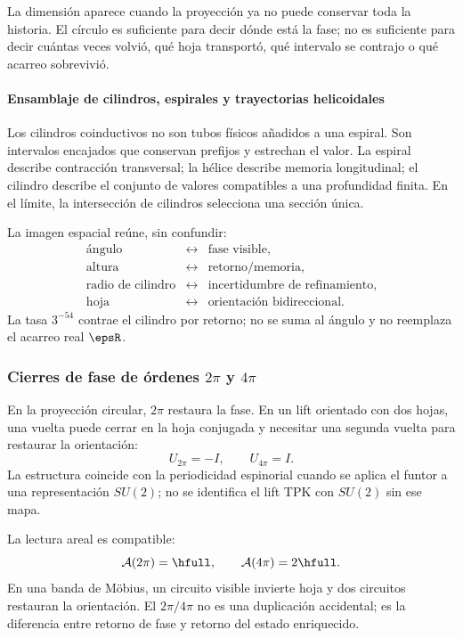 \begin{narrativebox}
La dimensión aparece cuando la proyección ya no puede conservar toda la
historia. El círculo es suficiente para decir dónde está la fase; no es
suficiente para decir cuántas veces volvió, qué hoja transportó, qué intervalo
se contrajo o qué acarreo sobrevivió.
\end{narrativebox}

\paragraph{Ensamblaje de cilindros, espirales y trayectorias helicoidales}

Los cilindros coinductivos no son tubos físicos añadidos a una espiral. Son
intervalos encajados que conservan prefijos y estrechan el valor. La espiral
describe contracción transversal; la hélice describe memoria longitudinal;
el cilindro describe el conjunto de valores compatibles a una profundidad
finita. En el límite, la intersección de cilindros selecciona una sección
única.

La imagen espacial reúne, sin confundir:
\[
\begin{array}{ccl}
\text{ángulo} &\leftrightarrow& \text{fase visible},\\
\text{altura} &\leftrightarrow& \text{retorno/memoria},\\
\text{radio de cilindro} &\leftrightarrow& \text{incertidumbre de refinamiento},\\
\text{hoja} &\leftrightarrow& \text{orientación bidireccional}.
\end{array}
\]
La tasa \(3^{-54}\) contrae el cilindro por retorno; no se suma al ángulo y
no reemplaza el acarreo real \(\epsR\).

\subsubsection{Cierres de fase de órdenes \(2\pi\) y \(4\pi\)}

En la proyección circular, \(2\pi\) restaura la fase. En un lift orientado
con dos hojas, una vuelta puede cerrar en la hoja conjugada y necesitar una
segunda vuelta para restaurar la orientación:
\[
U_{2\pi}=-I,\qquad U_{4\pi}=I.
\]
La estructura coincide con la periodicidad espinorial cuando se aplica el
funtor a una representación \(SU(2)\); no se identifica el lift TPK con
\(SU(2)\) sin ese mapa.

La lectura areal es compatible:
\[
\mathcal A(2\pi)=\hfull,\qquad
\mathcal A(4\pi)=2\hfull.
\]
En una banda de Möbius, un circuito visible invierte hoja y dos circuitos
restauran la orientación. El \(2\pi/4\pi\) no es una duplicación accidental;
es la diferencia entre retorno de fase y retorno del estado enriquecido.
